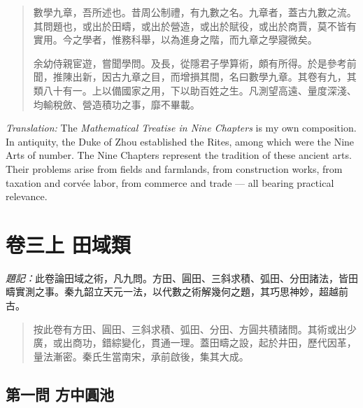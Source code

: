 \documentclass[11pt,a4paper]{article}
\begin{document}
\begin{quote}
數學九章，吾所述也。昔周公制禮，有九數之名。九章者，蓋古九數之流。其問題也，或出於田疇，或出於營造，或出於賦役，或出於商賈，莫不皆有實用。今之學者，惟務科舉，以為進身之階，而九章之學寢微矣。

余幼侍親宦遊，嘗聞學問。及長，從隱君子學算術，頗有所得。於是參考前聞，推陳出新，因古九章之目，而增損其間，名曰數學九章。其卷有九，其類八十有一。上以備國家之用，下以助百姓之生。凡測望高遠、量度深淺、均輸稅斂、營造積功之事，靡不畢載。
\end{quote}

\medskip
\noindent\textit{Translation:} The \textit{Mathematical Treatise in Nine Chapters} is my own composition. In antiquity, the Duke of Zhou established the Rites, among which were the Nine Arts of number. The Nine Chapters represent the tradition of these ancient arts. Their problems arise from fields and farmlands, from construction works, from taxation and corv\'{e}e labor, from commerce and trade --- all bearing practical relevance.

\newpage

\section{卷三上 田域類}
\label{sec:juan3shang}

\noindent\textit{題記：}此卷論田域之術，凡九問。方田、圓田、三斜求積、弧田、分田諸法，皆田疇實測之事。秦九韶立天元一法，以代數之術解幾何之題，其巧思神妙，超越前古。

\begin{quote}
按此卷有方田、圓田、三斜求積、弧田、分田、方圓共積諸問。其術或出少廣，或出商功，錯綜變化，貫通一理。蓋田疇之設，起於井田，歷代因革，量法漸密。秦氏生當南宋，承前啟後，集其大成。
\end{quote}

\subsection*{第一問 方中圓池}
\end{document}
